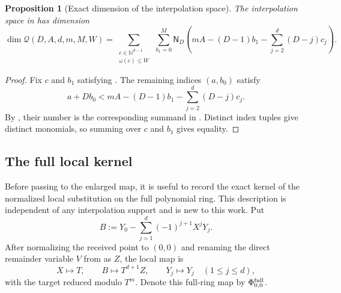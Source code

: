 \documentclass[11pt,letterpaper]{article}
\newtheorem{proposition}[proposition]{Proposition}
\theoremstyle{definition}
\newcommand{\N}{\mathbb{N}}
\newcommand{\Qspace}{\mathcal{Q}}
\begin{document}
\begin{proposition}[Exact dimension of the interpolation space]
\label{prop:exact-cap-free-dimension}
The interpolation space in  has
dimension
\begin{equation}
  \dim\Qspace(D,A,d,m,M,W)
  =
  \sum_{\substack{c\in\N^{d-1}\\\omega(c)\leq W}}
  \ \sum_{b_1=0}^{M}
  \mathsf N_D\left(
    mA-(D-1)b_1-
    \sum_{j=2}^{d}(D-j)c_j
  \right).
  \label{eq:exact-cap-free-dimension}
\end{equation}
\end{proposition}

\begin{proof}
Fix \(c\) and \(b_1\) satisfying .  The remaining
indices \((a,b_0)\) satisfy
\begin{equation}
  a+Db_0
  <
  mA-(D-1)b_1-
  \sum_{j=2}^{d}(D-j)c_j.
  \label{eq:dimension-residual-inequality}
\end{equation}
By , their number is the corresponding summand in
.  Distinct index tuples give distinct
monomials, so summing over \(c\) and \(b_1\) gives equality.
\end{proof}

\subsection{The full local kernel}

Before passing to the enlarged map, it is useful to record the exact kernel
of the normalized local substitution on the full polynomial ring.  This
description is independent of any interpolation support and is new to this
work.  Put
\begin{equation}
  B:=Y_0-\sum_{j=1}^{d}(-1)^{j+1}X^jY_j.
  \label{eq:backward-taylor-coordinate}
\end{equation}
After normalizing the received point to \((0,0)\) and renaming the direct
remainder variable $V$ from  as $Z$, the local
map is
\begin{equation}
  X\longmapsto T,\qquad
  B\longmapsto T^{d+1}Z,\qquad
  Y_j\longmapsto Y_j
  \quad(1\leq j\leq d),
  \label{eq:normalized-full-local-map}
\end{equation}
with the target reduced modulo \(T^m\).
Denote this full-ring map by \(\Phi^{\rm full}_{0,0}\).
\end{document}
